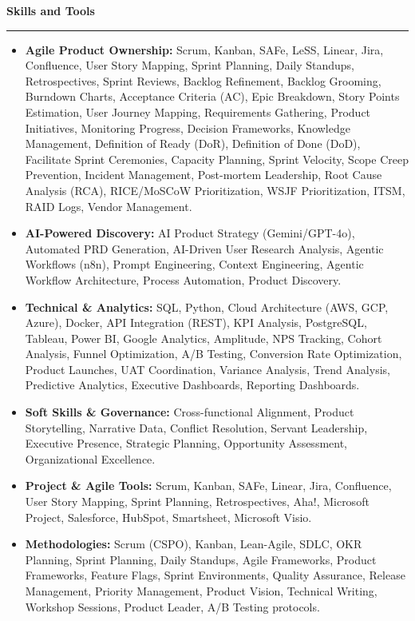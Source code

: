 \documentclass[9pt,letterpaper]{article} %
\newenvironment{rSection}[1]{ %
  \sectionskip
 \textbf{\Large #1} %
  \sectionlineskip
  \hrule %
  \begin{list}{}{ %
    \setlength{\leftmargin}{-0em} %
  }
  \item[]
}{
  \end{list}
}
\def\sectionlineskip{\smallskip} %
\def\sectionskip{} %
\begin{document}
\begin{rSection}{Skills and Tools}
\begin{itemize}[left=-1.5em, labelsep=.1cm, labelwidth=.2cm, itemsep=0.0em, topsep=0pt]
\item \textbf{Agile Product Ownership:} Scrum, Kanban, SAFe, LeSS, Linear, Jira, Confluence, User Story Mapping, Sprint Planning, Daily Standups, Retrospectives, Sprint Reviews, Backlog Refinement, Backlog Grooming, Burndown Charts, Acceptance Criteria (AC), Epic Breakdown, Story Points Estimation, User Journey Mapping, Requirements Gathering, Product Initiatives, Monitoring Progress, Decision Frameworks, Knowledge Management, Definition of Ready (DoR), Definition of Done (DoD), Facilitate Sprint Ceremonies, Capacity Planning, Sprint Velocity, Scope Creep Prevention, Incident Management, Post-mortem Leadership, Root Cause Analysis (RCA), RICE/MoSCoW Prioritization, WSJF Prioritization, ITSM, RAID Logs, Vendor Management.
\item \textbf{AI-Powered Discovery:} AI Product Strategy (Gemini/GPT-4o), Automated PRD Generation, AI-Driven User Research Analysis, Agentic Workflows (n8n), Prompt Engineering, Context Engineering, Agentic Workflow Architecture, Process Automation, Product Discovery.
\item \textbf{Technical \& Analytics:} SQL, Python, Cloud Architecture (AWS, GCP, Azure), Docker, API Integration (REST), KPI Analysis, PostgreSQL, Tableau, Power BI, Google Analytics, Amplitude, NPS Tracking, Cohort Analysis, Funnel Optimization, A/B Testing, Conversion Rate Optimization, Product Launches, UAT Coordination, Variance Analysis, Trend Analysis, Predictive Analytics, Executive Dashboards, Reporting Dashboards.
\item \textbf{Soft Skills \& Governance:} Cross-functional Alignment, Product Storytelling, Narrative Data, Conflict Resolution, Servant Leadership, Executive Presence, Strategic Planning, Opportunity Assessment, Organizational Excellence.
\item \textbf{Project \& Agile Tools:} Scrum, Kanban, SAFe, Linear, Jira, Confluence, User Story Mapping, Sprint Planning, Retrospectives, Aha!, Microsoft Project, Salesforce, HubSpot, Smartsheet, Microsoft Visio.
\item \textbf{Methodologies:} Scrum (CSPO), Kanban, Lean-Agile, SDLC, OKR Planning, Sprint Planning, Daily Standups, Agile Frameworks, Product Frameworks, Feature Flags, Sprint Environments, Quality Assurance, Release Management, Priority Management, Product Vision, Technical Writing, Workshop Sessions, Product Leader, A/B Testing protocols.
\end{itemize}
\end{rSection}%
\end{document}
